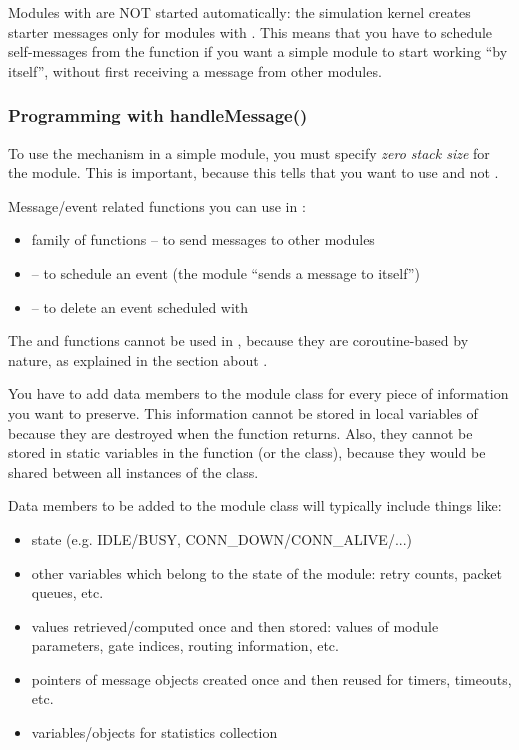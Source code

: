 Modules with  are NOT started automatically:
the simulation kernel creates starter messages
only for modules with . This means that you have to
schedule self-messages from the
 function if you want a 
simple module to start working ``by itself'', without first receiving
a message from other modules.


\subsubsection{Programming with handleMessage()}
\label{sec:simple-modules:handlemessage:programming}

To use the  mechanism in a simple module, you must
specify \textit{zero stack size} for the module.
This is important, because this tells {\opp} that you want to use
 and not .

Message/event related functions you can use in :

\begin{itemize}
  \item {} family of functions -- to send messages to other modules
  \item {} -- to schedule an event (the module ``sends a message to itself'')
  \item {} -- to delete an event scheduled with 
\end{itemize}

The  and  functions cannot be used in
, because they are coroutine-based by nature, as
explained in the section about .

You have to add data members to the module class for every piece
of information you want to preserve. This information cannot
be stored in local variables of  because they
are destroyed when the function returns. Also, they cannot be
stored in static variables in the function (or the class), because
they would be shared between all instances of the class.

Data members to be added to the module class will typically include
things like:

\begin{itemize}
  \item state (e.g. IDLE/BUSY, CONN\_DOWN/CONN\_ALIVE/...)
  \item other variables which belong to the state of the module: retry
    counts, packet queues, etc.
  \item values retrieved/computed once and then stored: values of module
    parameters, gate indices, routing information, etc.
  \item pointers of message objects created once and then reused for
    timers, timeouts, etc.
  \item variables/objects for statistics collection
\end{itemize}

